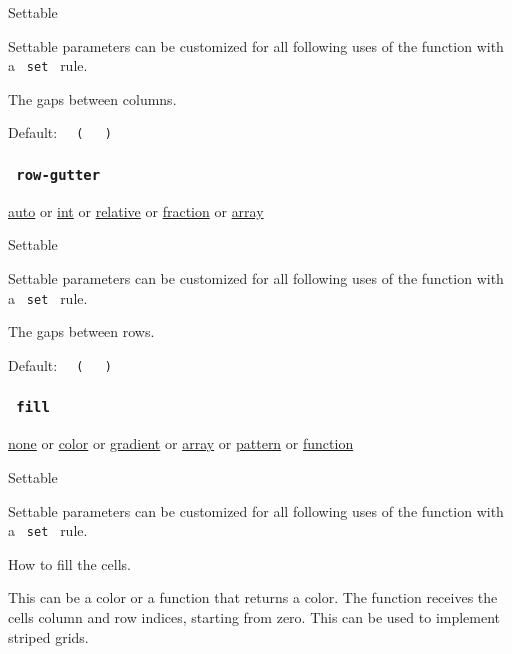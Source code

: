 {{ Settable }}

\label{parameters-column-gutter-settable-tooltip}
Settable parameters can be customized for all following uses of the
function with a \texttt{\ set\ } rule.

The gaps between columns.

Default:
\texttt{\ }{\texttt{\ (\ }}\texttt{\ }{\texttt{\ )\ }}\texttt{\ }

\subsubsection{\texorpdfstring{\texttt{\ row-gutter\ }}{ row-gutter }}\label{parameters-row-gutter}

\href{/docs/reference/foundations/auto/}{auto} {or}
\href{/docs/reference/foundations/int/}{int} {or}
\href{/docs/reference/layout/relative/}{relative} {or}
\href{/docs/reference/layout/fraction/}{fraction} {or}
\href{/docs/reference/foundations/array/}{array}

{{ Settable }}

\label{parameters-row-gutter-settable-tooltip}
Settable parameters can be customized for all following uses of the
function with a \texttt{\ set\ } rule.

The gaps between rows.

Default:
\texttt{\ }{\texttt{\ (\ }}\texttt{\ }{\texttt{\ )\ }}\texttt{\ }

\subsubsection{\texorpdfstring{\texttt{\ fill\ }}{ fill }}\label{parameters-fill}

\href{/docs/reference/foundations/none/}{none} {or}
\href{/docs/reference/visualize/color/}{color} {or}
\href{/docs/reference/visualize/gradient/}{gradient} {or}
\href{/docs/reference/foundations/array/}{array} {or}
\href{/docs/reference/visualize/pattern/}{pattern} {or}
\href{/docs/reference/foundations/function/}{function}

{{ Settable }}

\label{parameters-fill-settable-tooltip}
Settable parameters can be customized for all following uses of the
function with a \texttt{\ set\ } rule.

How to fill the cells.

This can be a color or a function that returns a color. The function
receives the cells\textquotesingle{} column and row indices, starting
from zero. This can be used to implement striped grids.

